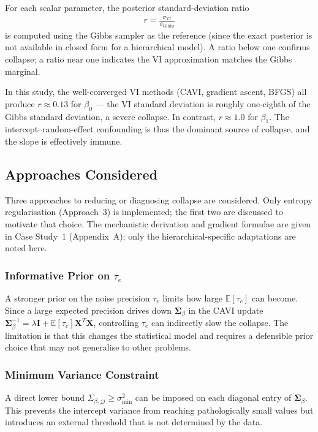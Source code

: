 \documentclass[11pt,a4paper]{article}
\newcommand{\E}{\mathbb{E}}
\begin{document}
For each scalar parameter, the posterior standard-deviation ratio
\begin{align}
  r = \frac{\sigma_{\mathrm{VI}}}{\sigma_{\mathrm{Gibbs}}}
\end{align}
is computed using the Gibbs sampler as the reference (since the exact posterior
is not available in closed form for a hierarchical model).
A ratio below one confirms collapse; a ratio near one indicates the VI
approximation matches the Gibbs marginal.

In this study, the well-converged VI methods (CAVI, gradient ascent, BFGS)
all produce $r \approx 0.13$ for $\beta_0$ --- the VI standard deviation is
roughly one-eighth of the Gibbs standard deviation, a severe collapse.
In contrast, $r \approx 1.0$ for $\beta_1$.
The intercept--random-effect confounding is thus the dominant source of
collapse, and the slope is effectively immune.

\subsection{Approaches Considered}

Three approaches to reducing or diagnosing collapse are considered.
Only entropy regularisation (Approach~3) is implemented; the first two are
discussed to motivate that choice.
The mechanistic derivation and gradient formulae are given in Case Study~1
(Appendix~A); only the hierarchical-specific adaptations are noted here.

\subsubsection{Informative Prior on $\tau_e$}

A stronger prior on the noise precision $\tau_e$ limits how large $\E[\tau_e]$
can become.
Since a large expected precision drives down $\bm{\Sigma}_\beta$ in the CAVI
update $\bm{\Sigma}_\beta^{-1} = \lambda\bm{I} + \E[\tau_e]\bm{X}^T\bm{X}$,
controlling $\tau_e$ can indirectly slow the collapse.
The limitation is that this changes the statistical model and requires a
defensible prior choice that may not generalise to other problems.

\subsubsection{Minimum Variance Constraint}

A direct lower bound $\Sigma_{\beta,jj} \geq \sigma^2_{\min}$ can be imposed
on each diagonal entry of $\bm{\Sigma}_\beta$.
This prevents the intercept variance from reaching pathologically small values
but introduces an external threshold that is not determined by the data.
\end{document}
